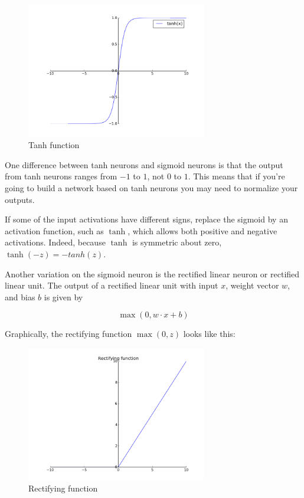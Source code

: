 \documentclass[12 pt]{article}
\begin{document}
\begin{figure}[htp]
\centering
\includegraphics[width=0.7\textwidth]{./figs/tanh_function.png}
\caption{Tanh function}
\end{figure}

One difference between tanh neurons and sigmoid neurons is that the
output from tanh neurons ranges from $ -1 $ to $ 1 $, not $ 0 $ to
$ 1 $. This means that if you're going to build a network based on
tanh neurons you may need to normalize your outputs\cite{ref3}.

If some of the input activations have different signs, replace the
sigmoid by an activation function, such as $ \tanh $,
which allows both positive and negative activations. Indeed, because $ \tanh $
is symmetric about zero, $ \tanh(−z) = −tanh(z) $.

Another variation on the sigmoid neuron is the rectified linear neuron
or rectified linear unit. The output of a rectified linear unit with
input $ x $, weight vector $ w $, and bias $ b $ is given by

\begin{equation}
    \max(0, w \cdot x + b)
\end{equation}

Graphically, the rectifying function $ \max(0, z) $ looks like this:

\begin{figure}[htp]
\centering
\includegraphics[width=0.7\textwidth]{./figs/rectifying_function.png}
\caption{Rectifying function}
\end{figure}
\end{document}

